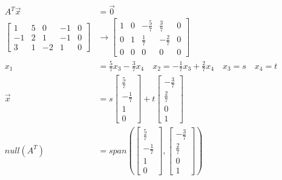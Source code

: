 \documentclass{math}
\begin{document}
\begin{align*}
  A^T\vec{x} &= \vec{0} \\
  \left[\begin{array}{cccc|c}
    1 & 5 & 0 & -1 & 0 \\
    -1 & 2 & 1 & -1 & 0 \\
    3 & 1 & -2 & 1 & 0
  \end{array}\right] &\to \left[\begin{array}{cccc|c}
    1 & 0 & -\frac{5}{7} & \frac{3}{7} & 0 \\
    0 & 1 & \frac{1}{7} & -\frac{2}{7} & 0 \\
    0 & 0 & 0 & 0 & 0
  \end{array}\right] \\
  x_1 &= \frac{5}{7}x_3-\frac{3}{7}x_4 \quad
    x_2 = -\frac{1}{7}x_3+\frac{2}{7}x_4 \quad x_3 = s \quad x_4 = t \\
  \vec{x} &= s\begin{bmatrix}\frac{5}{7} \\ -\frac{1}{7} \\ 1 \\ 0\end{bmatrix}+
    t\begin{bmatrix}-\frac{3}{7} \\ \frac{2}{7} \\ 0 \\ 1\end{bmatrix} \\
  null(A^T) &= span\left(
    \begin{bmatrix}\frac{5}{7} \\ -\frac{1}{7} \\ 1 \\ 0\end{bmatrix},
    \begin{bmatrix}-\frac{3}{7} \\ \frac{2}{7} \\ 0 \\ 1\end{bmatrix}
  \right)
\end{align*}
\end{document}
